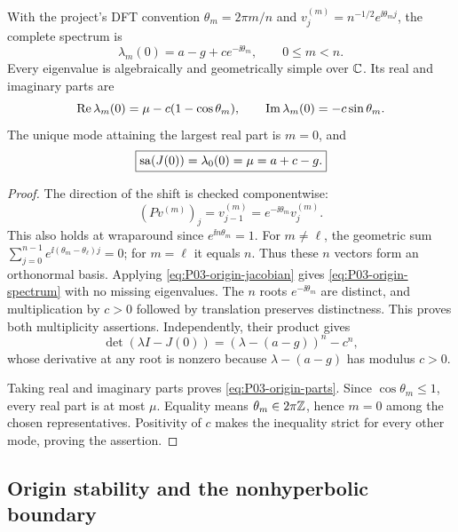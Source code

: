 \begin{proposition}
\label{prop:P03-origin-spectrum}
With the project's DFT convention $\theta_m=2\pi m/n$ and
$v^{(m)}_j=n^{-1/2}e^{\ii\theta_m j}$, the complete spectrum is
\begin{equation}
 \boxed{\lambda_m(0)=a-g+c e^{-\ii\theta_m},\qquad 0\le m<n.}
 \label{eq:P03-origin-spectrum}
\end{equation}
Every eigenvalue is algebraically and geometrically simple over $\mathbb{C}$.
Its real and imaginary parts are
\begin{equation}
 \operatorname{Re}\lambda_m(0)=\mu-c(1-\cos\theta_m),\qquad
 \operatorname{Im}\lambda_m(0)=-c\sin\theta_m.
 \label{eq:P03-origin-parts}
\end{equation}
The unique mode attaining the largest real part is $m=0$, and
\begin{equation}
 \boxed{\operatorname{sa}(J(0))=\lambda_0(0)=\mu=a+c-g.}
 \label{eq:P03-abscissa}
\end{equation}
\end{proposition}
\begin{proof}
The direction of the shift is checked componentwise:
\[
 (Pv^{(m)})_j=v^{(m)}_{j-1}
   =e^{-\ii\theta_m}v^{(m)}_j.
\]
This also holds at wraparound since $e^{\ii n\theta_m}=1$.
For $m\ne\ell$, the geometric sum
$\sum_{j=0}^{n-1}e^{\ii(\theta_m-\theta_\ell)j}=0$;
for $m=\ell$ it equals $n$. Thus these $n$ vectors form an
orthonormal basis. Applying \eqref{eq:P03-origin-jacobian} gives
\eqref{eq:P03-origin-spectrum} with no missing eigenvalues.
The $n$ roots $e^{-\ii\theta_m}$ are distinct, and multiplication
by $c>0$ followed by translation preserves distinctness. This proves
both multiplicity assertions. Independently, their product gives
\begin{equation}
 \det(\lambda I-J(0))=(\lambda-(a-g))^n-c^n,
 \label{eq:P03-characteristic}
\end{equation}
whose derivative at any root is nonzero because
$\lambda-(a-g)$ has modulus $c>0$.

Taking real and imaginary parts proves \eqref{eq:P03-origin-parts}.
Since $\cos\theta_m\le1$, every real part is at most $\mu$.
Equality means $\theta_m\in2\pi\mathbb{Z}$, hence $m=0$ among the
chosen representatives. Positivity of $c$ makes the inequality
strict for every other mode, proving the assertion.
\end{proof}

\subsection{Origin stability and the nonhyperbolic boundary}
\label{slot:P03-2}

